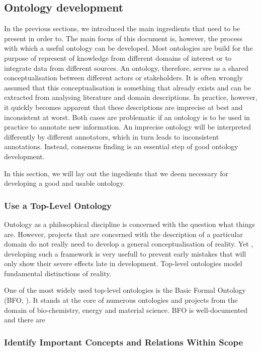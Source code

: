 


\subsection{Ontology development}

In the previous sections, we introduced the main ingredients that need to be present in order to. The main focus of this document is, however, the process with which a useful ontology can be developed. Most ontologies are build for the purpose of represent of knowledge from different domains of interest or to integrate data from different sources. An ontology, therefore, serves as a shared conceptualisation between different actors or stakeholders. It is often wrongly assumed that this conceptualisation is something that already exists and can be extracted from analysing literature and domain descriptions. In practice, however, it quickly becomes apparent that these descriptions are imprecise at best and inconsistent at worst. Both cases are problematic if an ontology is to be used in practice to annotate new information. An imprecise ontology will be interpreted differently by different annotators, which in turn leads to inconsistent annotations. Instead, consensus finding is an essential step of good ontology development.

In this section, we will lay out the ingedients that we deem necessary for developing a good and usable ontology.

\subsubsection{Use a Top-Level Ontology}

Ontology as a philosophical discipline is concerned with the question what things are. However, projects that are concerned with the description of a particular domain do not really need to develop a general conceptualisation of reality. Yet , developing such a framework is very usefull to prevent early mistakes that will only show their severe effects late in development. Top-level ontologies model fundamental distinctions of reality. 

One of the most widely used top-level ontologies is the Basic Formal Ontology (BFO, \cite{bfo-book}). It stands at the core of numerous ontologies and projects from the domain of bio-chemistry, energy and material science. BFO is well-documented and there are 

\subsubsection{Identify Important Concepts and Relations Within Scope}

